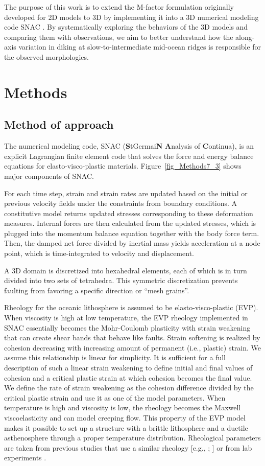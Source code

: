 \documentclass[draft,gc]{agutex}
\begin{document}
\begin{article}
The purpose of this work is to extend the M-factor formulation originally developed for 2D models to 3D by implementing it into a 3D numerical modeling code SNAC \citep{Choi2008}. By systematically exploring the behaviors of the 3D models and comparing them with observations, we aim to better understand how the along-axis variation in diking at slow-to-intermediate mid-ocean ridges is responsible for the observed morphologies.

\section{Methods}
\subsection{Method of approach}
The numerical modeling code, SNAC (\textbf{S}tGermai\textbf{N} \textbf{A}nalysis of \textbf{C}ontinua), is an explicit Lagrangian finite element code that solves the force and energy balance equations for elasto-visco-plastic materials. Figure~\ref{fig_Methods7_3} shows major components of SNAC.

For each time step, strain and strain rates are updated based on the initial or previous velocity fields under the constraints from boundary conditions. A constitutive model returns updated stresses corresponding to these deformation measures. Internal forces are then calculated from the updated stresses, which is plugged into the momentum balance equation together with the body force term. Then, the damped net force divided by inertial mass yields acceleration at a node point, which is time-integrated to velocity and displacement.

A 3D domain is discretized into hexahedral elements, each of which is in turn divided into two sets of tetrahedra. This symmetric discretization prevents faulting from favoring a specific direction or ``mesh grains''.

Rheology for the oceanic lithosphere is assumed to be elasto-visco-plastic (EVP). When viscosity is high at low temperature, the EVP rheology implemented in SNAC essentially becomes the Mohr-Coulomb plasticity with strain weakening that can create shear bands that behave like faults. Strain softening is realized by cohesion decreasing with increasing amount of permanent (i.e., plastic) strain. We assume this relationship is linear for simplicity. It is sufficient for a full description of such a linear strain weakening to define initial and final values of cohesion and a critical plastic strain at which cohesion becomes the final value. We define the rate of strain weakening as the cohesion difference divided by the critical plastic strain and use it as one of the model parameters. When temperature is high and viscosity is low, the rheology becomes the Maxwell viscoelasticity and can model creeping flow. This property of the EVP model makes it possible to set up a structure with a brittle lithosphere and a ductile asthenosphere through a proper temperature distribution. Rheological parameters are taken from previous studies that use a similar rheology [e.g., \citealp{Buck2005}; \citealp{Tucholke2008}] or from lab experiments \citep[e.g.,][]{Kirby1987}. 


\end{article}
\end{document}
